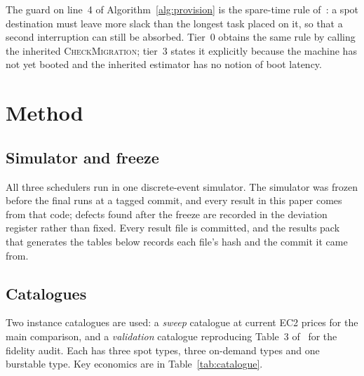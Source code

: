 \documentclass[conference]{IEEEtran}
\begin{document}
The guard on line~4 of Algorithm~\ref{alg:provision} is the spare-time rule
of~\cite[\S3.4]{teylo2023}: a spot destination must leave more slack than the
longest task placed on it, so that a second interruption can still be absorbed.
Tier~0 obtains the same rule by calling the inherited \textsc{CheckMigration};
tier~3 states it explicitly because the machine has not yet booted and the
inherited estimator has no notion of boot latency.

\section{Method}
\label{sec:method}

\subsection{Simulator and freeze}

All three schedulers run in one discrete-event simulator. The simulator was
frozen before the final runs at a tagged commit, and every result in this paper
comes from that code; defects found after the freeze are recorded in the
deviation register rather than fixed. Every result file is committed, and the
results pack that generates the tables below records each file's hash and the
commit it came from.

\subsection{Catalogues}

Two instance catalogues are used: a \emph{sweep} catalogue at current EC2 prices
for the main comparison, and a \emph{validation} catalogue reproducing
Table~3 of~\cite{teylo2023} for the fidelity audit. Each has three spot types,
three on-demand types and one burstable type. Key economics are in
Table~\ref{tab:catalogue}.
\end{document}
